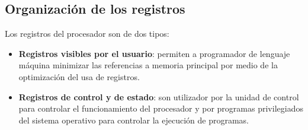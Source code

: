 \subsection{Organización de los registros}

Los registros del procesador son de dos tipos:

\begin{itemize}
  \item \textbf{Registros visibles por el usuario}: permiten a programador de lenguaje máquina minimizar las referencias a memoria principal por medio de la optimización del usa de registros.
  \item \textbf{Registros de control y de estado}: son utilizador por la unidad de control para controlar el funcionamiento del procesador y por programas privilegiados del sistema operativo para controlar la ejecución de programas.
\end{itemize}

